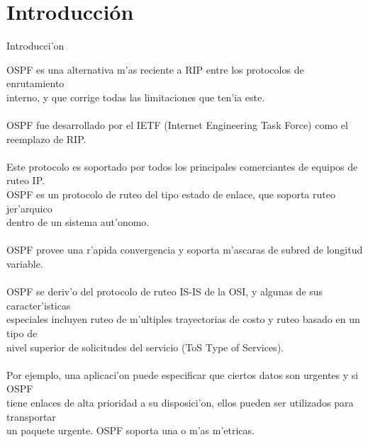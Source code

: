 \documentclass[xcolor=dvipsnames]{beamer}
\begin{document}
\section{Introducci\'on}
	\begin{frame}{Introducci'on}
	\scriptsize
	{
	\begin{tabbing}
	OSPF es una alternativa m'as reciente a RIP entre los protocolos de enrutamiento \\
	interno, y que corrige todas las limitaciones que ten'{i}a este. \\ \\
	OSPF fue desarrollado por el IETF (Internet Engineering Task Force) como el \\
	reemplazo de RIP. \\ \\
	Este protocolo es soportado	por todos los principales comerciantes de equipos de ruteo IP. \\
	OSPF es un protocolo de ruteo del tipo estado de enlace, que soporta ruteo jer'arquico \\
	dentro de un sistema aut'onomo. \\ \\
	
	OSPF provee una r'apida convergencia y soporta m'ascaras de subred de longitud variable. \\ \\
	OSPF se deriv'o del protocolo de ruteo IS-IS de la OSI, y algunas de sus caracter'{i}sticas \\
	especiales incluyen ruteo de m'ultiples trayectorias de costo y ruteo basado en un tipo de \\
	nivel superior de solicitudes del servicio (ToS Type of Services). \\ \\
	Por ejemplo, una aplicaci'on puede especificar que ciertos datos son urgentes y si OSPF \\
	tiene enlaces de alta prioridad a su disposici'on, ellos pueden ser utilizados para transportar \\
	un paquete urgente. OSPF soporta una o m'as m'etricas. \\ \\
	\end{tabbing}
	}
	\end{frame}
\end{document}
